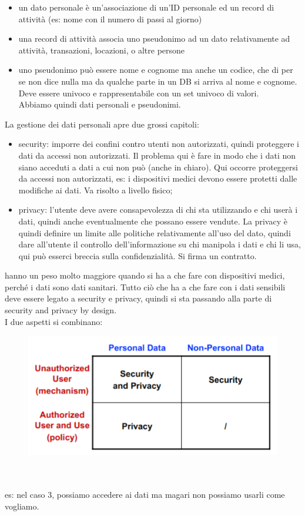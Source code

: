 \documentclass[oneside, 12pt]{extbook}
\begin{document}
\begin{itemize}
	\item un dato personale è un'associazione di un'ID personale ed un record di attività (es: nome con il numero di passi al giorno)
	\item una record di attività associa uno pseudonimo ad un dato relativamente ad attività, transazioni, locazioni, o altre persone
	\item uno pseudonimo può essere nome e cognome ma anche un codice, che di per se non dice nulla ma da qualche parte in un DB si arriva al nome e cognome. Deve essere univoco e rappresentabile con un set univoco di valori.\\Abbiamo quindi dati personali e pseudonimi.
\end{itemize}
La gestione dei dati personali apre due grossi capitoli:
\begin{itemize}
	\item security: imporre dei confini contro utenti non autorizzati, quindi proteggere i dati da accessi non autorizzati. Il problema qui è fare in modo che i dati non siano acceduti a dati a cui non può (anche in chiaro). Qui occorre proteggersi da accessi non autorizzati, es: i dispositivi medici devono essere protetti dalle modifiche ai dati. Va risolto a livello fisico;
	\item privacy: l'utente deve avere consapevolezza di chi sta utilizzando e chi userà i dati, quindi anche eventualmente che possano essere vendute. La privacy è quindi definire un limite alle politiche relativamente all'uso del dato, quindi dare all'utente il controllo dell'informazione su chi manipola i dati e chi li usa, qui può esserci breccia sulla confidenzialità. Si firma un contratto.
\end{itemize}
hanno un peso molto maggiore quando si ha a che fare con dispositivi medici, perché i dati sono dati sanitari. Tutto ciò che ha a che fare con i dati sensibili deve essere legato a security e privacy, quindi si sta passando alla parte di security and privacy by design.\\I due aspetti si combinano:\\
\begin{figure}[!h]
	\includegraphics[scale=0.3]{immagini/sec-priv.png}
\end{figure}
\\\\es: nel caso 3, possiamo accedere ai dati ma magari non possiamo usarli come vogliamo.
\end{document}

